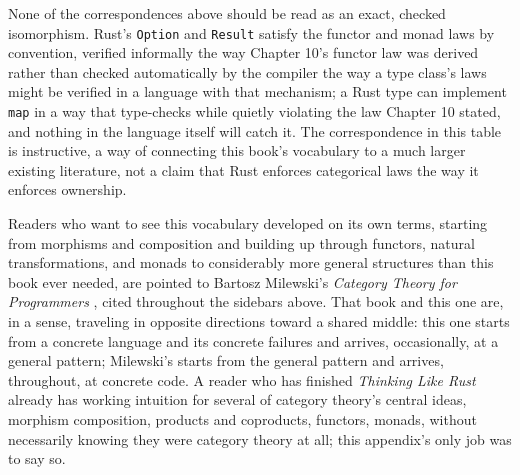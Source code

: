 \documentclass[11pt]{book}
\begin{document}
None of the correspondences above should be read as an exact, checked isomorphism. Rust's \texttt{Option} and \texttt{Result} satisfy the functor and monad laws by convention, verified informally the way Chapter 10's functor law was derived rather than checked automatically by the compiler the way a type class's laws might be verified in a language with that mechanism; a Rust type can implement \texttt{map} in a way that type-checks while quietly violating the law Chapter 10 stated, and nothing in the language itself will catch it. The correspondence in this table is instructive, a way of connecting this book's vocabulary to a much larger existing literature, not a claim that Rust enforces categorical laws the way it enforces ownership.

Readers who want to see this vocabulary developed on its own terms, starting from morphisms and composition and building up through functors, natural transformations, and monads to considerably more general structures than this book ever needed, are pointed to Bartosz Milewski's \textit{Category Theory for Programmers} \cite{milewski2019}, cited throughout the sidebars above. That book and this one are, in a sense, traveling in opposite directions toward a shared middle: this one starts from a concrete language and its concrete failures and arrives, occasionally, at a general pattern; Milewski's starts from the general pattern and arrives, throughout, at concrete code. A reader who has finished \textit{Thinking Like Rust} already has working intuition for several of category theory's central ideas, morphism composition, products and coproducts, functors, monads, without necessarily knowing they were category theory at all; this appendix's only job was to say so.
\end{document}

